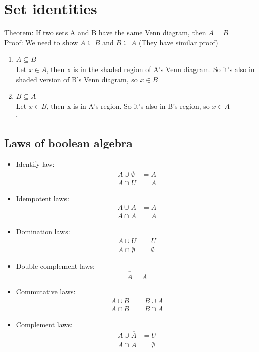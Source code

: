 \documentclass{article}
\begin{document}
\section{Set identities}
Theorem: If two sets A and B have the same Venn diagram, then $A=B$
\\ Proof: We need to show $A \subseteq B \text{ and } B \subseteq A $ (They have similar proof)
\begin{enumerate}
    \item $A \subseteq B$ \\ Let $x \in A$, then x is in the shaded region of A's Venn diagram. So it's also in shaded version of B's Venn diagram, so $x \in B$
    \item $B \subseteq A$ \\ Let $x \in B$, then x is in A's region. So it's also in B's region, so $x \in A$
          \\ \hspace*{\fill} $\square$

\end{enumerate}

\subsection{Laws of boolean algebra}
\begin{itemize}
    \item Identify law: \begin{align*}
              A \cup \emptyset & = A \\
              A \cap U         & = A
          \end{align*}
    \item Idempotent laws: \begin{align*}
              A \cup A & = A \\
              A \cap A & = A
          \end{align*}
    \item Domination laws: \begin{align*}
              A \cup U         & = U         \\
              A \cap \emptyset & = \emptyset
          \end{align*}
    \item Double complement laws: \[
              \overline{\overline{A}} = A
          \]
    \item Commutative laws: \begin{align*}
              A \cup B & = B \cup A \\
              A \cap B & = B \cap A
          \end{align*}
    \item Complement laws: \begin{align*}
              A \cup \overline{A} & = U         \\
              A\cap \overline{A}  & = \emptyset
          \end{align*}
\end{itemize}
\end{document}
